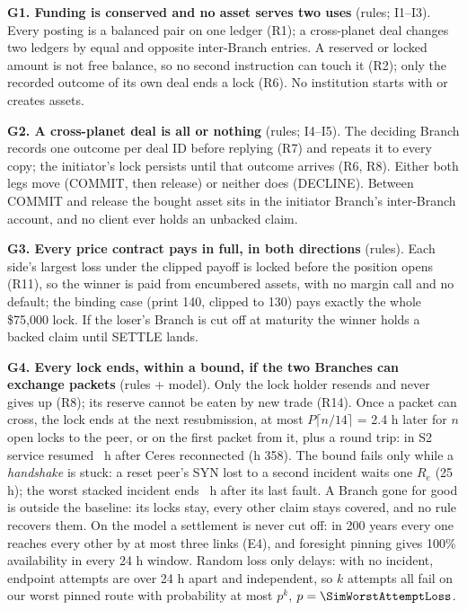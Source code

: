 \textbf{G1. Funding is conserved and no asset serves two uses} (rules; I1--I3). Every posting is a balanced pair on one ledger (R1); a cross-planet deal changes
two ledgers by equal and opposite inter-Branch entries. A reserved or locked amount is not free balance, so no second instruction can touch it (R2); only the
recorded outcome of its own deal ends a lock (R6). No institution starts with or creates assets.

\textbf{G2. A cross-planet deal is all or nothing} (rules; I4--I5). The deciding Branch records one outcome per deal ID before replying (R7) and repeats it to every
copy; the initiator's lock persists until that outcome arrives (R6, R8). Either both legs move (COMMIT, then release) or neither does (DECLINE). Between COMMIT and
release the bought asset sits in the initiator Branch's inter-Branch account, and no client ever holds an unbacked claim.

\textbf{G3. Every price contract pays in full, in both directions} (rules). Each side's largest loss under the clipped payoff is locked before the position opens
(R11), so the winner is paid from encumbered assets, with no margin call and no default; the binding case (print 140, clipped to 130) pays exactly the whole
\$75{,}000 lock. If the loser's Branch is cut off at maturity the winner holds a backed claim until SETTLE lands.

\textbf{G4. Every lock ends, within a bound, if the two Branches can exchange packets} (rules + model). Only the lock holder resends and never gives up (R8); its
reserve cannot be eaten by new trade (R14). Once a packet can cross, the lock ends at the next resubmission, at most $P\lceil n/14\rceil$ = 2.4 h later for $n$ open locks
to the peer, or on the first packet from it, plus a round trip: in S2 service resumed \SimSTwoFRSpendableAfter\ h after Ceres reconnected (h 358). The bound fails only
while a \emph{handshake} is stuck: a reset peer's SYN lost to a second incident waits one $R_e$ (25 h); the worst stacked incident ends \SimStackAfter\ h after its last
fault. A Branch gone for good is outside the baseline: its locks stay, every other claim stays covered, and no rule recovers them. On the model a settlement is never cut
off: in 200 years every one reaches every other by at most three links (E4), and foresight pinning gives 100\% availability in every 24 h window. Random loss
only delays: with no incident, endpoint attempts are over 24 h apart and independent, so $k$ attempts all fail on our worst pinned route with probability at most $p^k$,
$p = \SimWorstAttemptLoss$.


